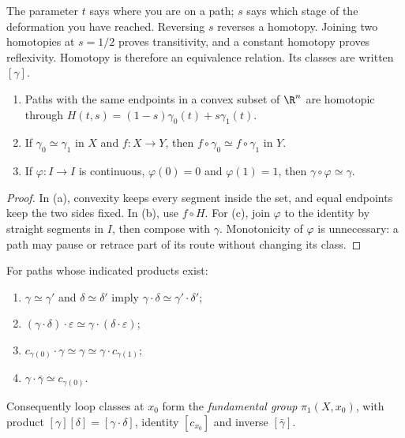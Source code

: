 The parameter $t$ says where you are on a path; $s$ says which stage of the deformation you have reached. Reversing $s$ reverses a homotopy. Joining two homotopies at $s=1/2$ proves transitivity, and a constant homotopy proves reflexivity. Homotopy is therefore an equivalence relation. Its classes are written $[\gamma]$.

\begin{lemma}\label{lem:convexhomotopy}
\begin{enumerate}
\item[(a)] Paths with the same endpoints in a convex subset of $\R^n$ are homotopic through $H(t,s)=(1-s)\gamma_0(t)+s\gamma_1(t)$.
\item[(b)] If $\gamma_0\simeq\gamma_1$ in $X$ and $f:X\to Y$, then $f\circ\gamma_0\simeq f\circ\gamma_1$ in $Y$.
\item[(c)] If $\varphi:I\to I$ is continuous, $\varphi(0)=0$ and $\varphi(1)=1$, then $\gamma\circ\varphi\simeq\gamma$.
\end{enumerate}
\end{lemma}

\begin{proof}
In (a), convexity keeps every segment inside the set, and equal endpoints keep the two sides fixed. In (b), use $f\circ H$. For (c), join $\varphi$ to the identity by straight segments in $I$, then compose with $\gamma$. Monotonicity of $\varphi$ is unnecessary: a path may pause or retrace part of its route without changing its class.
\end{proof}

\begin{proposition}\label{prop:pi1group}
For paths whose indicated products exist:
\begin{enumerate}
\item[(a)] $\gamma\simeq\gamma'$ and $\delta\simeq\delta'$ imply $\gamma\cdot\delta\simeq\gamma'\cdot\delta'$;
\item[(b)] $(\gamma\cdot\delta)\cdot\varepsilon\simeq\gamma\cdot(\delta\cdot\varepsilon)$;
\item[(c)] $c_{\gamma(0)}\cdot\gamma\simeq\gamma\simeq\gamma\cdot c_{\gamma(1)}$;
\item[(d)] $\gamma\cdot\bar\gamma\simeq c_{\gamma(0)}$.
\end{enumerate}
Consequently loop classes at $x_0$ form the \emph{fundamental group} $\pi_1(X,x_0)$, with product $[\gamma][\delta]=[\gamma\cdot\delta]$, identity $[c_{x_0}]$ and inverse $[\bar\gamma]$.
\end{proposition}

